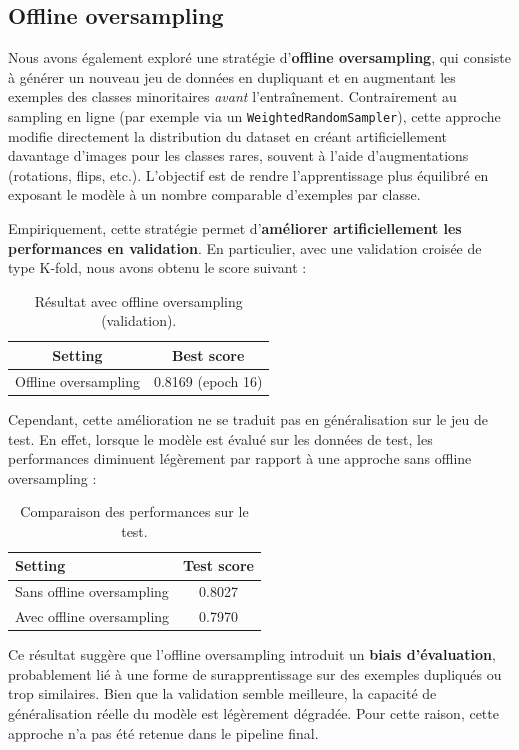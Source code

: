 \documentclass[journal,twocolumn]{IEEEtran}
\begin{document}
\subsection{Offline oversampling}


Nous avons également exploré une stratégie d’\textbf{offline oversampling}, qui consiste à générer un nouveau jeu de données en dupliquant et en augmentant les exemples des classes minoritaires \textit{avant} l’entraînement. Contrairement au sampling en ligne (par exemple via un \texttt{WeightedRandomSampler}), cette approche modifie directement la distribution du dataset en créant artificiellement davantage d’images pour les classes rares, souvent à l’aide d’augmentations (rotations, flips, etc.). L’objectif est de rendre l’apprentissage plus équilibré en exposant le modèle à un nombre comparable d’exemples par classe.

Empiriquement, cette stratégie permet d’\textbf{améliorer artificiellement les performances en validation}. En particulier, avec une validation croisée de type K-fold, nous avons obtenu le score suivant :

\begin{table}[h]
\centering
\caption{Résultat avec offline oversampling (validation).}
\begin{tabular}{|c|c|}
\hline
\textbf{Setting} & \textbf{Best score} \\
\hline
Offline oversampling & 0.8169 (epoch 16) \\
\hline
\end{tabular}
\end{table}

Cependant, cette amélioration ne se traduit pas en généralisation sur le jeu de test. En effet, lorsque le modèle est évalué sur les données de test, les performances diminuent légèrement par rapport à une approche sans offline oversampling :

\begin{table}[h]
\centering
\caption{Comparaison des performances sur le test.}
\begin{tabular}{|l|c|}
\hline
\textbf{Setting} & \textbf{Test score} \\
\hline
Sans offline oversampling & 0.8027 \\
Avec offline oversampling & 0.7970 \\
\hline
\end{tabular}
\end{table}

Ce résultat suggère que l’offline oversampling introduit un \textbf{biais d’évaluation}, probablement lié à une forme de surapprentissage sur des exemples dupliqués ou trop similaires. Bien que la validation semble meilleure, la capacité de généralisation réelle du modèle est légèrement dégradée. Pour cette raison, cette approche n’a pas été retenue dans le pipeline final.
\end{document}
